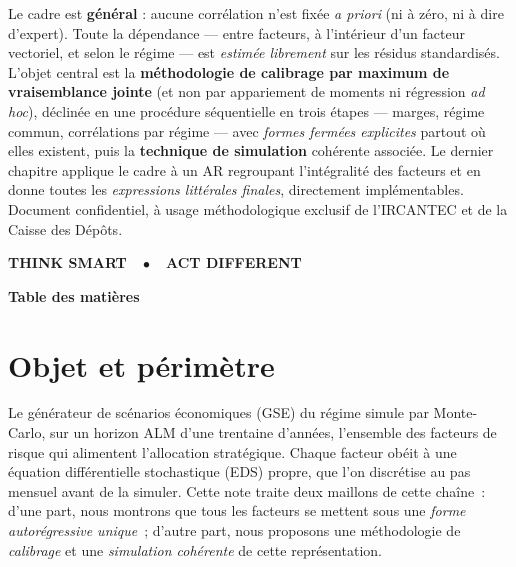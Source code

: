\documentclass[11pt,a4paper]{article}
\theoremstyle{definition}
\begin{document}
\begin{titlepage}
\begin{minipage}{\textwidth}
\vspace{2mm}
Le cadre est \textbf{général} : aucune corrélation n'est fixée \emph{a priori} (ni à zéro, ni à dire d'expert). Toute la dépendance --- entre facteurs, à l'intérieur d'un facteur vectoriel, et selon le régime --- est \emph{estimée librement} sur les résidus standardisés. L'objet central est la \textbf{méthodologie de calibrage par maximum de vraisemblance jointe} (et non par appariement de moments ni régression \emph{ad hoc}), déclinée en une procédure séquentielle en trois étapes --- marges, régime commun, corrélations par régime --- avec \emph{formes fermées explicites} partout où elles existent, puis la \textbf{technique de simulation} cohérente associée. Le dernier chapitre applique le cadre à un AR regroupant l'intégralité des facteurs et en donne toutes les \emph{expressions littérales finales}, directement implémentables. Document confidentiel, à usage méthodologique exclusif de l'IRCANTEC et de la Caisse des Dépôts.
\end{minipage}
\vfill
\begin{center}{\sffamily\bfseries\large\color{nxnavy}THINK SMART~~\textcolor{nxred}{$\bullet$}~~ACT DIFFERENT}\end{center}
\end{titlepage}

\begingroup
\hypersetup{hidelinks}
{\noindent\sffamily\Huge\bfseries\color{nxnavy}Table des matières\par}
\vspace{16mm}
\tableofcontents
{}
\endgroup
\newpage

\section{Objet et périmètre}

Le générateur de scénarios économiques (GSE) du régime simule par Monte-Carlo, sur un horizon ALM d'une trentaine d'années, l'ensemble des facteurs de risque qui alimentent l'allocation stratégique. Chaque facteur obéit à une équation différentielle stochastique (EDS) propre, que l'on discrétise au pas mensuel avant de la simuler. Cette note traite deux maillons de cette chaîne~: d'une part, nous montrons que tous les facteurs se mettent sous une \emph{forme autorégressive unique}~; d'autre part, nous proposons une méthodologie de \emph{calibrage} et une \emph{simulation cohérente} de cette représentation.
\end{document}
